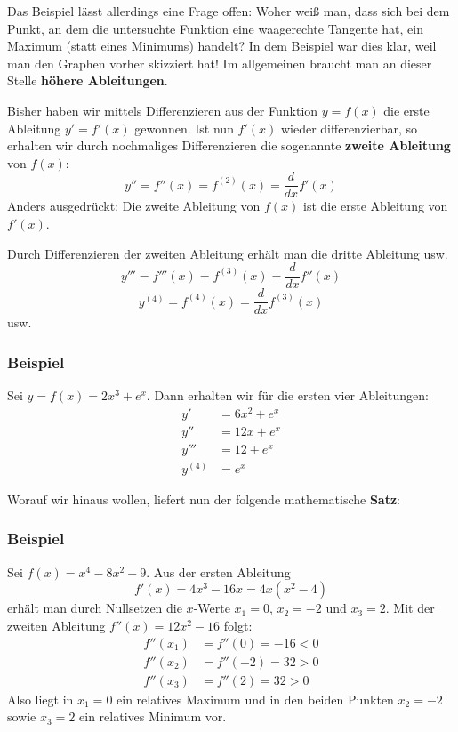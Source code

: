 Das Beispiel lässt allerdings eine Frage offen: Woher weiß man, dass sich bei dem Punkt, an dem die untersuchte Funktion eine waagerechte Tangente hat, ein Maximum (statt eines Minimums) handelt? In dem Beispiel war dies klar, weil man den Graphen vorher skizziert hat! Im allgemeinen braucht man an dieser Stelle \textbf{höhere Ableitungen}.

Bisher haben wir mittels Differenzieren aus der Funktion $y = f(x)$ die erste Ableitung $y' = f'(x)$ gewonnen. Ist nun $f'(x)$ wieder differenzierbar, so erhalten wir durch nochmaliges Differenzieren die sogenannte \textbf{zweite Ableitung} von $f(x)$:
\[ y'' = f''(x) = f^{(2)}(x) = \frac{d}{dx} f'(x) \]
Anders ausgedrückt: Die zweite Ableitung von $f(x)$ ist die erste Ableitung von $f'(x)$.

Durch Differenzieren der zweiten Ableitung erhält man die dritte Ableitung usw.
\[ y''' = f'''(x) = f^{(3)}(x) = \frac{d}{dx} f''(x) \]
\[ y^{(4)} = f^{(4)}(x) = \frac{d}{dx} f^{(3)}(x) \]
usw.

\subsubsection{Beispiel}

Sei $y = f(x) = 2x^3 + e^x$. Dann erhalten wir für die ersten vier Ableitungen:
\begin{align*}
  y' &= 6x^2 + e^x\\
  y'' &= 12x + e^x\\
  y''' &= 12 + e^x\\
  y^{(4)} &= e^x
\end{align*}\beispielende

Worauf wir hinaus wollen, liefert nun der folgende mathematische \textbf{Satz}:


\subsubsection{Beispiel}

Sei $f(x) = x^4 - 8x^2 - 9$. Aus der ersten Ableitung
\[ f'(x) = 4x^3 - 16x = 4x(x^2 - 4) \]
erhält man durch Nullsetzen die $x$-Werte $x_1 = 0$, $x_2 = -2$ und $x_3 = 2$. Mit der zweiten Ableitung $f''(x) = 12x^2 - 16$ folgt:
\begin{align*}
  f''(x_1) &= f''(0) = -16 < 0\\
  f''(x_2) &= f''(-2) = 32 > 0\\
  f''(x_3) &= f''(2) = 32 > 0
\end{align*}
Also liegt in $x_1 = 0$ ein relatives Maximum und in den beiden Punkten $x_2 = -2$ sowie $x_3 = 2$ ein relatives Minimum vor.\beispielende

